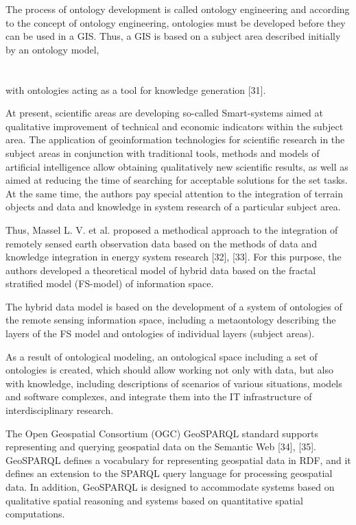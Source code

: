 \documentclass[10pt, letterpaper, twoside]{article}
\begin{document}
\begin{multicols}{2}
The process of ontology development is called ontology engineering and according to the concept of ontology
engineering, ontologies must be developed before they
can be used in a GIS. Thus, a GIS is based on a
subject area described initially by an ontology model,
\\
\\
\\with ontologies acting as a tool for knowledge generation
[31].

At present, scientific areas are developing so-called
Smart-systems aimed at qualitative improvement of technical and economic indicators within the subject area.
The application of geoinformation technologies for scientific research in the subject areas in conjunction with
traditional tools, methods and models of artificial intelligence allow obtaining qualitatively new scientific results,
as well as aimed at reducing the time of searching
for acceptable solutions for the set tasks. At the same
time, the authors pay special attention to the integration
of terrain objects and data and knowledge in system
research of a particular subject area.

Thus, Massel L. V. et al. proposed a methodical
approach to the integration of remotely sensed earth
observation data based on the methods of data and
knowledge integration in energy system research [32],
[33]. For this purpose, the authors developed a theoretical
model of hybrid data based on the fractal stratified model
(FS-model) of information space.

The hybrid data model is based on the development of
a system of ontologies of the remote sensing information
space, including a metaontology describing the layers of
the FS model and ontologies of individual layers (subject
areas).

As a result of ontological modeling, an ontological
space including a set of ontologies is created, which
should allow working not only with data, but also with
knowledge, including descriptions of scenarios of various
situations, models and software complexes, and integrate
them into the IT infrastructure of interdisciplinary research.

The Open Geospatial Consortium (OGC)
GeoSPARQL standard supports representing and
querying geospatial data on the Semantic Web [34],
[35]. GeoSPARQL defines a vocabulary for representing
geospatial data in RDF, and it defines an extension to the
SPARQL query language for processing geospatial data.
In addition, GeoSPARQL is designed to accommodate
systems based on qualitative spatial reasoning and
systems based on quantitative spatial computations.


\end{multicols}
\end{document}
